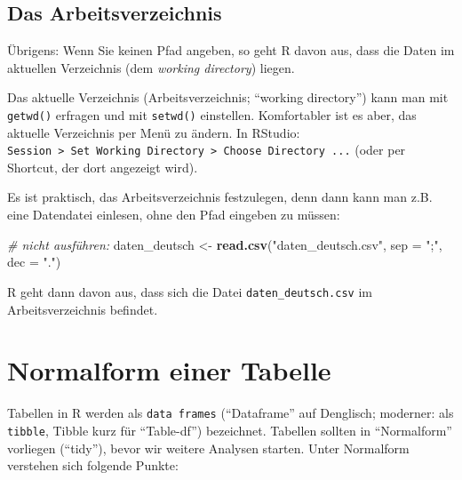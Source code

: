 \documentclass[12pt,ngerman,]{book}
\makeatletter
\newenvironment{Shaded}{\begin{snugshade}}{\end{snugshade}}
\newcommand{\KeywordTok}[1]{\textcolor[rgb]{0.13,0.29,0.53}{\textbf{{#1}}}}
\newcommand{\DataTypeTok}[1]{\textcolor[rgb]{0.13,0.29,0.53}{{#1}}}
\newcommand{\StringTok}[1]{\textcolor[rgb]{0.31,0.60,0.02}{{#1}}}
\newcommand{\CommentTok}[1]{\textcolor[rgb]{0.56,0.35,0.01}{\textit{{#1}}}}
\newcommand{\NormalTok}[1]{{#1}}
\newenvironment{kframe}{%
\medskip{}
\setlength{\fboxsep}{.8em}
 \def\at@end@of@kframe{}%
 \ifinner\ifhmode%
  \def\at@end@of@kframe{\end{minipage}}%
  \begin{minipage}{\columnwidth}%
 \fi\fi%
 \def\FrameCommand##1{\hskip\@totalleftmargin \hskip-\fboxsep
 \colorbox{shadecolor}{##1}\hskip-\fboxsep
     \hskip-\linewidth \hskip-\@totalleftmargin \hskip\columnwidth}%
 \MakeFramed {\advance\hsize-\width
   \@totalleftmargin\z@ \linewidth\hsize
   \@setminipage}}%
 {\par\unskip\endMakeFramed%
 \at@end@of@kframe}
\renewenvironment{Shaded}{\begin{kframe}}{\end{kframe}}
\let\BeginKnitrBlock\begin \let\EndKnitrBlock\end
\makeatother
\begin{document}
\subsection{Das Arbeitsverzeichnis}\label{das-arbeitsverzeichnis}

\BeginKnitrBlock{rmdcaution}
Übrigens: Wenn Sie keinen Pfad angeben, so geht R davon aus, dass die
Daten im aktuellen Verzeichnis (dem \emph{working directory}) liegen.
\EndKnitrBlock{rmdcaution}

Das aktuelle Verzeichnis (Arbeitsverzeichnis; ``working directory'')
kann man mit \texttt{getwd()} erfragen und mit \texttt{setwd()}
einstellen. Komfortabler ist es aber, das aktuelle Verzeichnis per Menü
zu ändern. In RStudio:
\texttt{Session\ \textgreater{}\ Set\ Working\ Directory\ \textgreater{}\ Choose\ Directory\ ...}
(oder per Shortcut, der dort angezeigt wird).

Es ist praktisch, das Arbeitsverzeichnis festzulegen, denn dann kann man
z.B. eine Datendatei einlesen, ohne den Pfad eingeben zu müssen:

\begin{Shaded}
\begin{Highlighting}[]
\CommentTok{# nicht ausführen:}
\NormalTok{daten_deutsch <-}\StringTok{ }\KeywordTok{read.csv}\NormalTok{(}\StringTok{"daten_deutsch.csv"}\NormalTok{, }\DataTypeTok{sep =} \StringTok{";"}\NormalTok{, }\DataTypeTok{dec =} \StringTok{"."}\NormalTok{)}
\end{Highlighting}
\end{Shaded}

R geht dann davon aus, dass sich die Datei \texttt{daten\_deutsch.csv}
im Arbeitsverzeichnis befindet.

\section{Normalform einer Tabelle}\label{normalform-einer-tabelle}

Tabellen in R werden als \texttt{data\ frames} (``Dataframe'' auf
Denglisch; moderner: als \texttt{tibble}, Tibble kurz für ``Table-df'')
bezeichnet. Tabellen sollten in ``Normalform'' vorliegen (``tidy''),
bevor wir weitere Analysen starten. Unter Normalform verstehen sich
folgende Punkte:
\end{document}
